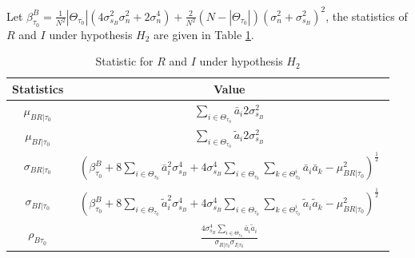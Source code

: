 Let $\beta_{\tau_0}^B = \frac{1}{N^2}|\Theta_{\tau_0}|(4\sigma_{s_B}^2\sigma_n^2+2\sigma_n^4) + \frac{2}{N^2}(N - |\Theta_{\tau_0}|)(\sigma_n^2+\sigma_{s_B}^2)^2$, 
the statistics of $R$ and $I$ under hypothesis $H_2$ are given in Table \ref{Table4}. 
\begin{table}[h]
\centering
  \begin{tabular}{|c|c|}
	\hline
	Statistics          & Value                                                                                                                                                                                                                 \\ \hline
	$\mu_{BR|\tau_0}$    & $\displaystyle{\sum_{i\in\Theta_{\tau_0}}\bar{a}_i2\sigma_{s_B}^2}$                                                                                                                                                                      \\ \hline
    $\mu_{BI|\tau_0}$    & $\displaystyle{\sum_{i\in\Theta_{\tau_0}}\tilde{a}_i2\sigma_{s_B}^2}$                                                                                                                                                                           \\ \hline
    $\sigma_{BR|\tau_0}$ & $\displaystyle{\left(\beta_{\tau_0}^B+8\sum_{i\in\Theta_{\tau_0}}\bar{a}_i^2\sigma_{s_B}^4 + 4\sigma_{s_B}^4\sum_{i\in\Theta_{\tau_0}}\sum_{k\in\Theta_{\tau_0}^i}\bar{a}_i\bar{a}_k- \mu_{BR|\tau_0}^2 \right)^\frac{1}{2}}$  \\ \hline
    $\sigma_{BI|\tau_0}$ & 
    $\begin{array} {l} \displaystyle{\left(\beta_{\tau_0}^B +8\sum_{i\in\Theta_{\tau_0}}\tilde{a}_i^2\sigma_{s_B}^4 +4\sigma_{s_B}^4\sum_{i\in\Theta_{\tau_0}}\sum_{k\in\Theta_{\tau_0}^i}\tilde{a}_i\tilde{a}_k- \mu_{BR|\tau_0}^2\right)^\frac{1}{2}}\end{array}$ 
    \\ \hline
	$\rho_{B\tau_0}$    & $ \displaystyle{\frac{4\sigma_{s_B}^4\sum_{i\in\Theta_{\tau_0}}\bar{a}_i\tilde{a}_i}{\sigma_{R|\tau_0}\sigma_{I|\tau_0}}}$                                                                            \\ \hline
  \end{tabular}
  \caption{Statistic for $R$ and $I$ under hypothesis $H_2$}
  \label{Table4}
\end{table}

